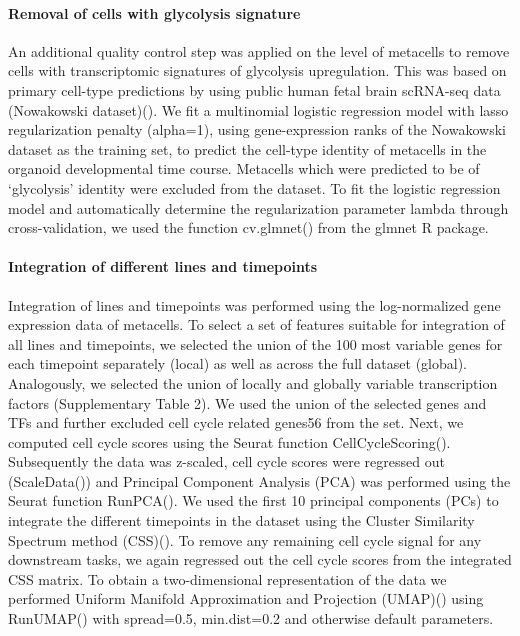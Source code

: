  
\paragraph{Removal of cells with glycolysis signature}
An additional quality control step was applied on the level of metacells to remove cells with transcriptomic signatures of glycolysis upregulation. This was based on primary cell-type predictions by using public human fetal brain scRNA-seq data (Nowakowski dataset)(\cite{nowakowski_spatiotemporal_2017}). We fit a multinomial logistic regression model with lasso regularization penalty (alpha=1), using gene-expression ranks of the Nowakowski dataset as the training set, to predict the cell-type identity of metacells in the organoid developmental time course. Metacells which were predicted to be of ‘glycolysis’ identity were excluded from the dataset. To fit the logistic regression model and automatically determine the regularization parameter lambda through cross-validation, we used the function cv.glmnet() from the glmnet R package.
 
 
\paragraph{Integration of different lines and timepoints}
Integration of lines and timepoints was performed using the log-normalized gene expression data of metacells. To select a set of features suitable for integration of all lines and timepoints, we selected the union of the 100 most variable genes for each timepoint separately (local) as well as across the full dataset (global). Analogously, we selected the union of locally and globally variable transcription factors (Supplementary Table 2). We used the union of the selected genes and TFs and further excluded cell cycle related genes56 from the set. Next, we computed cell cycle scores using the Seurat function CellCycleScoring(). Subsequently the data was z-scaled, cell cycle scores were regressed out (ScaleData()) and Principal Component Analysis (PCA) was performed using the Seurat function RunPCA(). We used the first 10 principal components (PCs) to integrate the different timepoints in the dataset using the Cluster Similarity Spectrum method (CSS)(\cite{he_css_2020}). To remove any remaining cell cycle signal for any downstream tasks, we again regressed out the cell cycle scores from the integrated CSS matrix. To obtain a two-dimensional representation of the data we performed Uniform Manifold Approximation and Projection (UMAP)(\cite{becht_dimensionality_2019}) using RunUMAP() with spread=0.5, min.dist=0.2 and otherwise default parameters.
 
